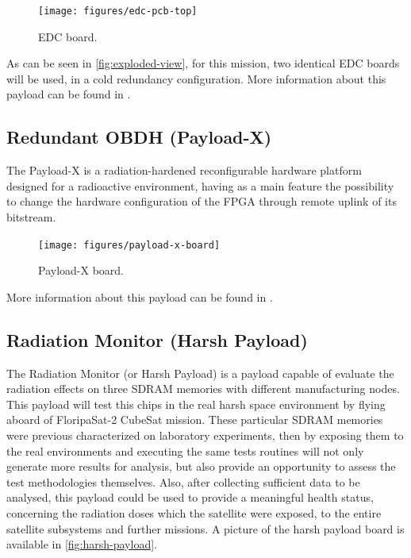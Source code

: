 \begin{figure}[!ht]
    \begin{center}
        \texttt{[image: figures/edc-pcb-top]}
        \caption{EDC board.}
        \label{fig:edc-board}
    \end{center}
\end{figure}

As can be seen in \autoref{fig:exploded-view}, for this mission, two identical EDC boards will be used, in a cold redundancy configuration. More information about this payload can be found in \cite{edc}.

\subsection{Redundant OBDH (Payload-X)}

The Payload-X is a radiation-hardened reconfigurable hardware platform designed for a radioactive environment, having as a main feature the possibility to change the hardware configuration of the FPGA through remote uplink of its bitstream.

\begin{figure}[!ht]
    \begin{center}
        \texttt{[image: figures/payload-x-board]}
        \caption{Payload-X board.}
        \label{fig:payload-x-board}
    \end{center}
\end{figure}

More information about this payload can be found in \cite{rigo2019}.

\subsection{Radiation Monitor (Harsh Payload)}

The Radiation Monitor (or Harsh Payload) is a payload capable of evaluate the radiation effects on three SDRAM memories with different manufacturing nodes. This payload will test this chips in the real harsh space environment by flying aboard of FloripaSat-2 CubeSat mission. These particular SDRAM memories were previous characterized on laboratory experiments, then by exposing them to the real environments and executing the same tests routines will not only generate more results for analysis, but also provide an opportunity to assess the test methodologies themselves. Also, after collecting sufficient data to be analysed, this payload could be used to provide a meaningful health status, concerning the radiation doses which the satellite were exposed, to the entire satellite subsystems and further missions. A picture of the harsh payload board is available in \autoref{fig:harsh-payload}.

